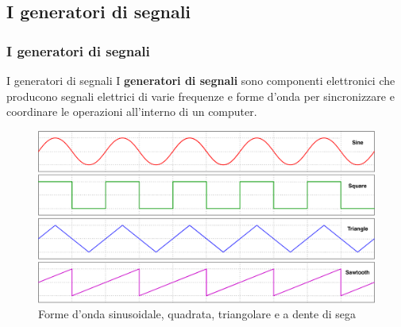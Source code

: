 \subsection[I generatori di segnali]{I generatori di segnali}
\begin{frame}
	\frametitle{I generatori di segnali}
	
	\begin{block}{I generatori di segnali}
		I \textbf{generatori di segnali} sono componenti elettronici che producono segnali elettrici di varie frequenze e forme d'onda per sincronizzare e coordinare le operazioni all'interno di un computer.
	\end{block}
	
	\begin{figure}[!htbp]
		\centering 
		\includegraphics[width=0.65\linewidth]{images/2_elettronica/waveforms.pdf}
		\caption{Forme d'onda sinusoidale, quadrata, triangolare e a dente di sega}
		\label{fig:electronics_waveforms}
	\end{figure}
\end{frame}


